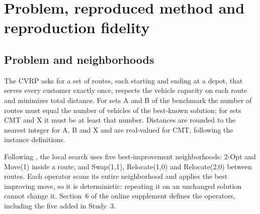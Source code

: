 \section{Problem, reproduced method and reproduction fidelity}\label{sec:method}

\subsection{Problem and neighborhoods}
The CVRP asks for a set of routes, each starting and ending at a depot, that serves every customer exactly once, respects the vehicle capacity on each route and minimizes total distance. For sets A and B of the benchmark the number of routes must equal the number of vehicles of the best-known solution; for sets CMT and X it must be at least that number. Distances are rounded to the nearest integer for A, B and X and are real-valued for CMT, following the instance definitions.

Following \citet{kalatzantonakis2023}, the local search uses five best-improvement neighborhoods: 2-Opt and Move(1) inside a route, and Swap(1,1), Relocate(1,0) and Relocate(2,0) between routes. Each operator scans its entire neighborhood and applies the best improving move, so it is deterministic: repeating it on an unchanged solution cannot change it. Section~6 of the online supplement defines the operators, including the five added in Study~3.

